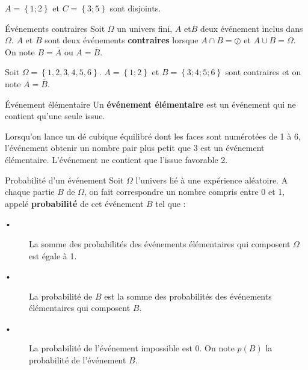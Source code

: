 \begin{Ex}
$A = \left\lbrace 1 ; 2 \right\rbrace $ et $C = \left\lbrace  3 ; 5 \right\rbrace$ sont disjoints.
\end{Ex}


\begin{DefT}{Événements contraires} 
Soit $\Omega$ un univers fini, $A$ et$ B$ deux événement inclus dans $\Omega$.
$A$ et $B$ sont deux événements \textbf{contraires} lorsque $A \cap B = \oslash$ et $A \cup B = \Omega$. On note $B=\overline{A}$ ou $A=\overline{B}$.
\end{DefT}

\begin{Ex}
Soit $\Omega =  \left\lbrace 1, 2, 3, 4, 5, 6 \right\rbrace $. $A = \left\lbrace1 ; 2\right\rbrace $ et $B = \left\lbrace 3 ; 4 ; 5 ; 6 \right\rbrace $ sont contraires et on note $A=\overline{B}$.
\end{Ex}


\begin{DefT}{Événement élémentaire} 
Un \textbf{événement élémentaire} est un événement qui ne contient qu'une seule issue.
\end{DefT}

\begin{Ex}
Lorsqu'on lance un dé cubique équilibré dont les faces sont numérotées de 1 à 6, l'événement obtenir un nombre pair plus petit que 3 est un événement élémentaire. L'événement ne contient que l'issue favorable 2. 
\end{Ex}




\begin{DefT}{Probabilité d'un événement} 
Soit $\Omega$ l'univers lié à une expérience aléatoire.
A chaque partie $B$ de $\Omega$, on fait correspondre un nombre compris entre 0 et 1, appelé \textbf{probabilité} de cet
événement $B$ tel que :
\begin{description}
\item[•] La somme des probabilités des événements élémentaires qui composent $\Omega$ est égale à 1.
\item[•] La probabilité de $B$ est la somme des probabilités des événements élémentaires qui composent $B$.
\item[•] La probabilité de l'événement impossible est 0. On note $p(B)$ la probabilité de l'événement $B$.
\end{description}
\end{DefT}


